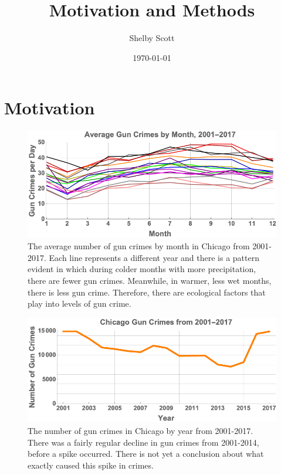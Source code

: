 \documentclass{article}
\begin{document}
\title{Motivation and Methods}
\author{Shelby Scott}
\date{\today}
\maketitle

\section*{Motivation}
\begin{figure} [htbp] \centering
 \includegraphics[scale=0.5]{figures/AverageCrimeData.png}
 \caption{The average number of gun crimes by month in Chicago from 2001-2017. Each line represents a different year and there is a pattern evident in which during colder months with more precipitation, there are fewer gun crimes. Meanwhile, in warmer, less wet months, there is less gun crime. Therefore, there are ecological factors that play into levels of gun crime.}
\end{figure}

\begin{figure}[htbp] \centering
 \includegraphics[scale=0.50]{figures/YearlyCrimeData.png}
 \caption{The number of gun crimes in Chicago by year from 2001-2017. There was a fairly regular decline in gun crimes from 2001-2014, before a spike occurred. There is not yet a conclusion about what exactly caused this spike in crimes.}
\end{figure}
\end{document}
